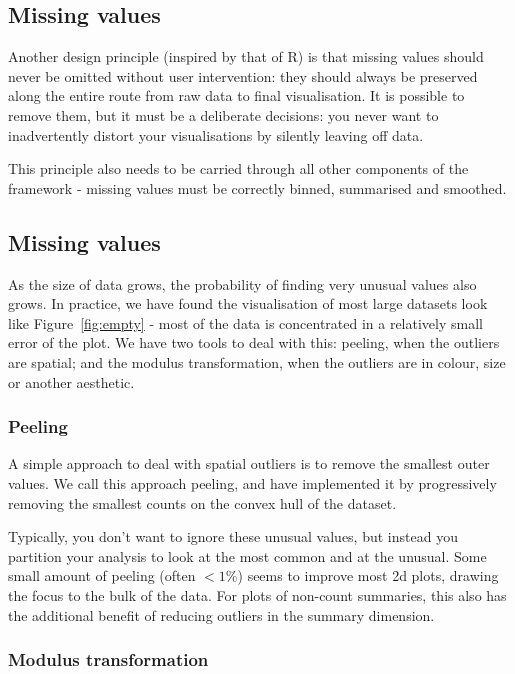 \documentclass[journal]{vgtc}                %
\begin{document}
\subsection{Missing values}

Another design principle (inspired by that of R) is that missing values should never be omitted without user intervention: they should always be preserved along the entire route from raw data to final visualisation. It is possible to remove them, but it must be a deliberate decisions: you never want to inadvertently distort your visualisations by silently leaving off data.

This principle also needs to be carried through all other components of the framework - missing values must be correctly binned, summarised and smoothed.

\subsection{Missing values}

As the size of data grows, the probability of finding very unusual values also grows. In practice, we have found the visualisation of most large datasets look like Figure~\ref{fig:empty} - most of the data is concentrated in a relatively small error of the plot. We have two tools to deal with this: peeling, when the outliers are spatial; and the modulus transformation, when the outliers are in colour, size or another aesthetic.

\subsubsection{Peeling}

A simple approach to deal with spatial outliers is to remove the smallest outer values. We call this approach peeling, and have implemented it by progressively removing the smallest counts on the convex hull of the dataset.

Typically, you don't want to ignore these unusual values, but instead you partition your analysis to look at the most common and at the unusual. Some small amount of peeling (often $< 1\%$) seems to improve most 2d plots, drawing the focus to the bulk of the data.  For plots of non-count summaries, this also has the additional benefit of reducing outliers in the summary dimension. 

\subsubsection{Modulus transformation}
\end{document}
